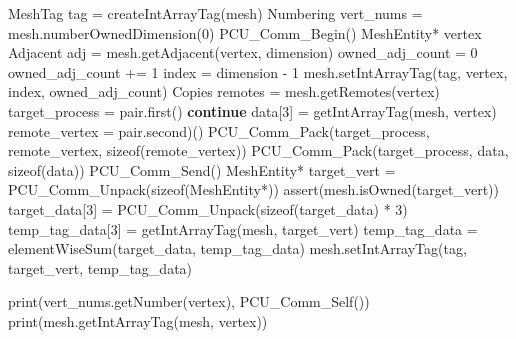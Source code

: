 \documentclass{article}
\begin{document}
\begin{algorithm}
\begin{algorithmic}

    \State MeshTag tag = createIntArrayTag(mesh) 
    \State Numbering vert\_nums = mesh.numberOwnedDimension(0) 
    \State PCU\_Comm\_Begin()
    \State MeshEntity* vertex
            \State Adjacent adj = mesh.getAdjacent(vertex, dimension)
            \State owned\_adj\_count = 0
                    \State owned\_adj\_count += 1 
                \EndIf
            \EndFor
            \State index = dimension - 1 
            \State mesh.setIntArrayTag(tag, vertex, index, owned\_adj\_count) 
        \EndFor
            \State Copies remotes = mesh.getRemotes(vertex) 
                \State target\_process = pair.first()
                    \State \textbf{continue} 
                \EndIf
                \State data[3] = getIntArrayTag(mesh, vertex)
                \State remote\_vertex = pair.second)()
                \State PCU\_Comm\_Pack(target\_process, remote\_vertex, sizeof(remote\_vertex))
                \State PCU\_Comm\_Pack(target\_process, data, sizeof(data))
            \EndFor
        \EndIf
    \EndFor
    \State PCU\_Comm\_Send() 
     
        \State MeshEntity* target\_vert = PCU\_Comm\_Unpack(sizeof(MeshEntity*))
        \State assert(mesh.isOwned(target\_vert)) 
        \State target\_data[3] = PCU\_Comm\_Unpack(sizeof(target\_data) * 3)
        \State temp\_tag\_data[3] = getIntArrayTag(mesh, target\_vert)
        \State temp\_tag\_data = elementWiseSum(target\_data, temp\_tag\_data)
        \State mesh.setIntArrayTag(tag, target\_vert, temp\_tag\_data) 

    \EndWhile

        \State print(vert\_nums.getNumber(vertex), PCU\_Comm\_Self())
        \State print(mesh.getIntArrayTag(mesh, vertex))

    \EndFor
\EndProcedure

\end{algorithmic}
\end{algorithm}
\end{document}
